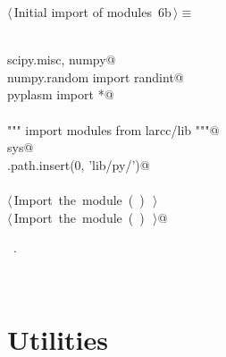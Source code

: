 \documentclass[11pt,oneside]{article}	%
\begin{document}
\begin{flushleft} \small
\begin{minipage}{\linewidth} \label{scrap12}
\protect{}$\langle\,$Initial import of modules\nobreak\ {\footnotesize 6b}$\,\rangle\equiv$
\vspace{-1ex}
\begin{list}{}{} \item
\mbox{}\verb@@\\
\mbox{}\verb@import scipy.misc, numpy@\\
\mbox{}\verb@from numpy.random import randint@\\
\mbox{}\verb@from pyplasm import *@\\
\mbox{}\verb@@\\
\mbox{}\verb@""" import modules from larcc/lib """@\\
\mbox{}\verb@import sys@\\
\mbox{}\verb@sys.path.insert(0, 'lib/py/')@\\
\mbox{}\verb@@\\
\mbox{}\verb@@\hbox{$\langle\,$Import the module\nobreak\ ({\footnotesize {}\label{scrap13}
 }\mbox{}\verb@largrid@ ) {\footnotesize {}}$\,\rangle$}\verb@@\\
\mbox{}\verb@@\hbox{$\langle\,$Import the module\nobreak\ ({\footnotesize {}\label{scrap14}
 }\mbox{}\verb@morph@ ) {\footnotesize {}}$\,\rangle$}\verb@ @\\
\mbox{}\verb@@{\NWsep}
\end{list}
\vspace{-1ex}
\footnotesize\addtolength{\baselineskip}{-1ex}
\begin{list}{}{\setlength{\itemsep}{-\parsep}\setlength{\itemindent}{-\leftmargin}}
\item \NWtxtMacroRefIn\ .
\end{list}
\end{minipage}\\[4ex]
\end{flushleft}

\appendix
\section{Utilities}
\end{document}
